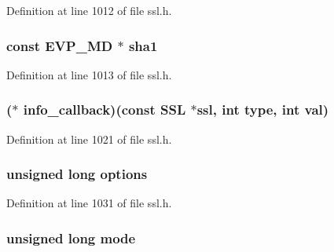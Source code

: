 Definition at line 1012 of file ssl.\+h.

\subsubsection[{\texorpdfstring{sha1}{sha1}}]{\setlength{\rightskip}{0pt plus 5cm}const {\bf E\+V\+P\+\_\+\+MD} $\ast$ sha1}\hypertarget{structssl__ctx__st_a64ea1cb8e4b1be363a2ab9e7179a1cc5}{}\label{structssl__ctx__st_a64ea1cb8e4b1be363a2ab9e7179a1cc5}


Definition at line 1013 of file ssl.\+h.

\subsubsection[{\texorpdfstring{info\+\_\+callback}{info_callback}}]{($\ast$ info\+\_\+callback)(const {\bf S\+SL} $\ast$ssl, int {\bf type}, int val)}\hypertarget{structssl__ctx__st_a185f1e577fa5512b45a82a08e1b28805}{}\label{structssl__ctx__st_a185f1e577fa5512b45a82a08e1b28805}


Definition at line 1021 of file ssl.\+h.

\subsubsection[{\texorpdfstring{options}{options}}]{\setlength{\rightskip}{0pt plus 5cm}unsigned long options}\hypertarget{structssl__ctx__st_aa6e0a0e8b728c3cc137ba2dfac41f277}{}\label{structssl__ctx__st_aa6e0a0e8b728c3cc137ba2dfac41f277}


Definition at line 1031 of file ssl.\+h.

\subsubsection[{\texorpdfstring{mode}{mode}}]{\setlength{\rightskip}{0pt plus 5cm}unsigned long mode}\hypertarget{structssl__ctx__st_ae78fbaec9753aee588d055aef59a801c}{}\label{structssl__ctx__st_ae78fbaec9753aee588d055aef59a801c}


